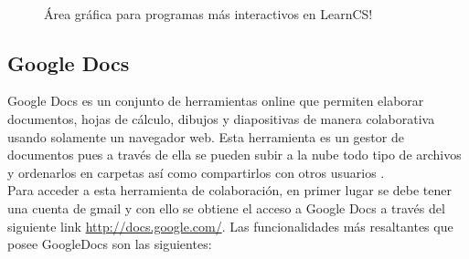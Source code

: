 \begin{figure}[!h]
  \centering
  \\
  \caption[LearnCS]{Área gráfica para programas más interactivos en LearnCS! \protect\cite{lipman_learncs_2014}}\label{fig:learncs2}
\end{figure}

\subsection{Google Docs}

Google Docs es un conjunto de herramientas online que permiten elaborar documentos, hojas de cálculo, dibujos y diapositivas de manera colaborativa usando solamente un navegador web. Esta herramienta es un gestor de documentos pues a través de ella se pueden subir a la nube todo tipo de archivos y ordenarlos en carpetas así como compartirlos con otros usuarios \cite{googledocs}.\\

Para acceder a esta herramienta de colaboración, en primer lugar se debe tener una cuenta de gmail y con ello se obtiene el acceso a Google Docs a través del siguiente link \url{http://docs.google.com/}. Las funcionalidades más resaltantes que posee GoogleDocs son las siguientes: \cite{googledocs}\\

